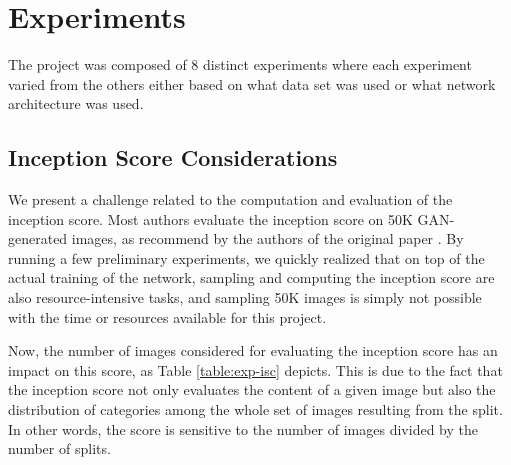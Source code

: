 
\section{Experiments}
The project was composed of 8 distinct experiments where each experiment varied from the others either based on what data set was used or what network architecture was used.

\subsection{Inception Score Considerations}

We present a challenge related to the computation and evaluation of the inception score. Most authors evaluate the inception score on 50K GAN-generated images, as recommend by the authors of the original paper \cite{salimans2016improved}. By running a few preliminary experiments, we quickly realized that on top of the actual training of the network, sampling and computing the inception score are also resource-intensive tasks, and sampling 50K images is simply not possible with the time or resources available for this project.


Now, the number of images considered for evaluating the inception score has an impact on this score, as Table \ref{table:exp-isc} depicts. This is due to the fact that the inception score not only evaluates the content of a given image but also the distribution of categories among the whole set of images resulting from the split. In other words, the score is sensitive to the number of images divided by the number of splits. 

